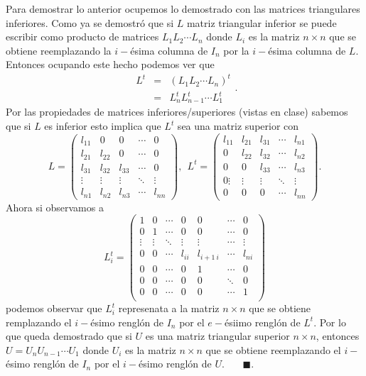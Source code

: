 \documentclass[11pt,letterpaper]{article}
\newcommand{\fin}{$\blacksquare.$}
\begin{document}
\begin{enumerate}
Para demostrar lo anterior ocupemos lo demostrado con las matrices triangulares inferiores. Como ya se demostró que si $L$ matriz triangular inferior se puede escribir como producto de matrices $L_1L_2\cdots L_n$ donde $L_i$ es la matriz $n\times n$ que se obtiene reemplazando la $i-$ésima columna de $I_n$ por la $i-$ésima columna de $L$. Entonces ocupando este hecho podemos ver que 
\begin{equation*}
\begin{array}{ccc}
L^t&=&(L_1L_2\cdots L_n)^t\\
&=&L_n^tL_{n-1}^t\cdots L_1^t
\end{array}.
\end{equation*}
Por las propiedades de matrices inferiores/superiores (vistas en clase) sabemos que si $L$ es inferior esto implica que $L^t$ sea una matriz superior con 
$$L=\left( \begin{array}{ccccc}
l_{11}&0 & 0 & \cdots &0\\
l_{21}&l_{22}& 0 & \cdots & 0\\
l_{31}&l_{32}& l_{33}& \cdots & 0\\
\vdots & \vdots & \vdots & \ddots & \vdots\\
l_{n1}&l_{n2}&l_{n3}& \cdots & l_{nn}
\end{array}\right), \ \ L^t=\left( \begin{array}{ccccc}
l_{11}&l_{21} & l_{31} & \cdots &l_{n1}\\
0&l_{22}& l_{32} & \cdots & l_{n2}\\
0&0& l_{33}& \cdots & l_{n3}\\
0\vdots & \vdots & \vdots & \ddots & \vdots\\
0&0&0& \cdots & l_{nn}
\end{array}\right).$$
Ahora si observamos a
$$L_i^t=\left( \begin{array}{ccccccc}
1&0&\cdots &0&0&\cdots&0\\
0&1&\cdots &0&0&\cdots&0\\
\vdots&\vdots&\ddots&\vdots&\vdots&\cdots&\vdots\\
0&0&\cdots&l_{ii}&l_{i+1\ i}&\cdots&l_{ni}\\
0&0&\cdots&0&1&\cdots&0\\
0&0&\cdots&0&0&\ddots&0\\
0&0&\cdots&0&0&\cdots&1\\
\end{array}\right)$$
podemos observar que $L_i^t$ represenata a la matriz $n\times n$ que se obtiene remplazando el $i-$ésimo renglón de $I_n$ por el $e-$ésiimo renglón de $L^t$. Por lo que queda demostrado que si $U$ es una matriz triangular superior $n\times n$, entonces $U=U_nU_{n-1}\cdots U_1$ donde $U_i$ es la matriz $n\times n$ que se obtiene reemplazando el $i-$ésimo renglón de $I_n$ por el $i-$ésimo renglón de $U$. \ \ \ \fin


\end{enumerate}
\end{document}
